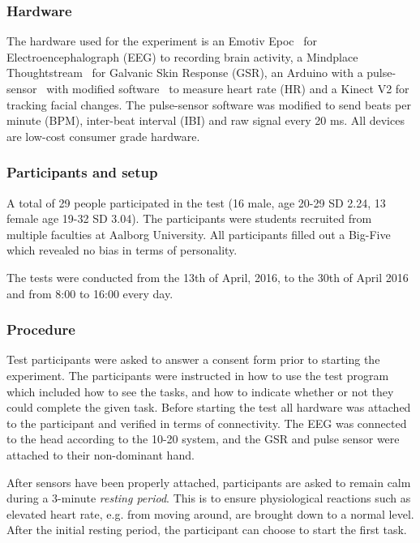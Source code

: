 \subsubsection{Hardware}
The hardware used for the experiment is an Emotiv Epoc~\cite{emotiv_epoc_website} for Electroencephalograph (EEG) to recording brain activity, a Mindplace Thoughtstream~\cite{thoughtstream} for Galvanic Skin Response (GSR), an Arduino with a pulse-sensor~\cite{pulsesensor} with modified software~\cite{pulsesensorgit} to measure heart rate (HR) and a Kinect V2\cite{kinect_specs3} for tracking facial changes.
The pulse-sensor software was modified to send beats per minute (BPM), inter-beat interval (IBI) and raw signal every 20 ms.
All devices are low-cost consumer grade hardware.

\subsubsection{Participants and setup}
A total of 29 people participated in the test (16 male, age 20-29 SD 2.24, 13 female age 19-32 SD 3.04).
The participants were students recruited from multiple faculties at Aalborg University. 
All participants filled out a Big-Five\cite{big5} which revealed no bias in terms of personality.

The tests were conducted from the 13th of April, 2016, to the 30th of April 2016 and from 8:00 to 16:00 every day. 

\subsubsection{Procedure}
Test participants were asked to answer a consent form prior to starting the experiment.  The participants were
instructed in how to use the test program which included how to see the tasks, and how to indicate whether or not they
could complete the given task.  Before starting the test all hardware was attached to the participant and verified in
terms of connectivity.  The EEG was connected to the head according to the 10-20 system\cite{eeg_tech_10_20}, and the
GSR and pulse sensor were attached to their non-dominant hand.

After sensors have been properly attached, participants are asked to remain calm during a 3-minute \textit{resting
  period}. This is to ensure physiological reactions such as elevated heart rate, e.g. from moving around, are brought
down to a normal level. After the initial resting period, the participant can choose to start the first task.

